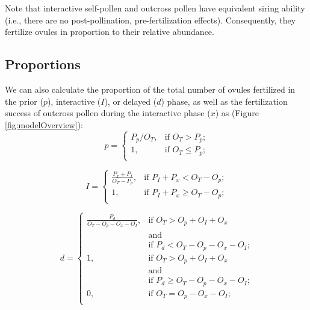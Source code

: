 \documentclass[12pt]{amsart}
\begin{document}
Note that interactive self-pollen and outcross pollen have equivalent siring ability (i.e., there are no post-pollination, pre-fertilization effects). Consequently, they fertilize ovules in proportion to their relative abundance.

\subsection{Proportions}
\label{section:proportions}
We can also calculate the proportion of the total number of ovules fertilized in the prior ($p$), interactive ($I$), or delayed ($d$) phase, as well as the fertilization success of outcross pollen during the interactive phase ($x$) as (Figure \ref{fig:modelOverview}):
\begin{equation} \label{eq:prior}
	p =
	\begin{cases}
		P_{p}/O_{T},	&\text{if $O_{T} > P_{p}$;}\\
		1,			&\text{if $O_{T} \leqslant P_{p}$;}\\
	\end{cases}
\end{equation}

\begin{equation} \label{eq:interactive}
	I =
	\begin{cases}
		\frac{P_{x}+P_{I}}{O_{T}-P_{p}},	&\text{if $P_{I} + P_{x} < O_{T} - O_{p}$;}\\
		1,						&\text{if $P_{I} + P_{x} \geqslant O_{T} - O_{p}$;}\\
	\end{cases}
\end{equation}

\begin{equation} \label{eq:delayed}
	d =
	\begin{cases}
		\frac{P_{d}}{O_{T}-O_{p}-O_{x}-O_{I}},	&\text{if $O_{T} > O_{p} + O_{I} + O_{x}$}\\
										&\text{and}\\
										&\text{if $P_{d} < O_{T}-O_{p}-O_{x}-O_{I}$;}\\
		1,								&\text{if $O_{T} > O_{p} + O_{I} + O_{x}$}\\
										&\text{and}\\
										&\text{if $P_{d} \geqslant O_{T}-O_{p}-O_{x}-O_{I}$;}\\
		0,							 	&\text{if $O_{T}=O_{p}-O_{x}-O_{I}$;}\\
	\end{cases}
\end{equation}
\end{document}
